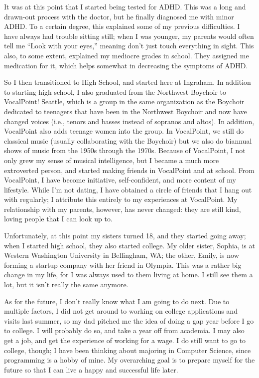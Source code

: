 \documentclass[12pt, letter]{article}
\begin{document}
	It was at this point that I started being tested for ADHD. This was a long and drawn-out process with the doctor, but he finally diagnosed me with minor ADHD. To a certain degree, this explained some of my previous difficulties. I have always had trouble sitting still; when I was younger, my parents would often tell me ``Look with your eyes,'' meaning don't just touch everything in sight. This also, to some extent, explained my mediocre grades in school. They assigned me medication for it, which helps somewhat in decreasing the symptoms of ADHD.
	
	So I then transitioned to High School, and started here at Ingraham. In addition to starting high school, I also graduated from the Northwest Boychoir to VocalPoint! Seattle, which is a group in the same organization as the Boychoir dedicated to teenagers that have been in the Northwest Boychoir and now have changed voices (i.e., tenors and basses instead of sopranos and altos). In addition, VocalPoint also adds teenage women into the group. In VocalPoint, we still do classical music (usually collaborating with the Boychoir) but we also do biannual shows of music from the 1950s through the 1970s. Because of VocalPoint, I not only grew my sense of musical intelligence, but I became a much more extroverted person, and started making friends in VocalPoint and at school. From VocalPoint, I have become initiative, self-confident, and more content of my lifestyle. While I'm not dating, I have obtained a circle of friends that I hang out with regularly; I attribute this entirely to my experiences at VocalPoint. My relationship with my parents, however, has never changed: they are still kind, loving people that I can look up to.
	
	Unfortunately, at this point my sisters turned 18, and they started going away; when I started high school, they also started college. My older sister, Sophia, is at Western Washington University in Bellingham, WA; the other, Emily, is now forming a startup company with her friend in Olympia. This was a rather big change in my life, for I was always used to them living at home. I still see them a lot, but it isn't really the same anymore.
	
	As for the future, I don't really know what I am going to do next. Due to multiple factors, I did not get around to working on college applications and visits last summer, so my dad pitched me the idea of doing a gap year before I go to college. I will probably do so, and take a year off from academia. I may also get a job, and get the experience of working for a wage. I do still want to go to college, though; I have been thinking about majoring in Computer Science, since programming is a hobby of mine. My overarching goal is to prepare myself for the future so that I can live a happy and successful life later.
		
\end{document}
